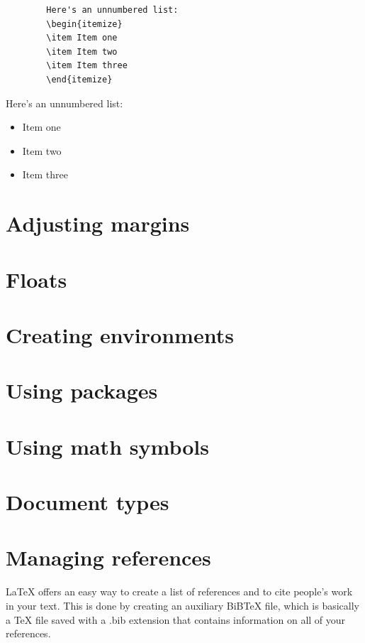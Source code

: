 \documentclass[12pts]{article}
\begin{document}
	\begin{multicols}{2}
		\begin{Verbatim}
		Here's an unnumbered list:
		\begin{itemize}
		\item Item one
		\item Item two
		\item Item three
		\end{itemize}
		\end{Verbatim}
		
		\columnbreak	
		
		Here's an unnumbered list:
		\begin{itemize}
			\item Item one
			\item Item two
			\item Item three
		\end{itemize}
	\end{multicols}
	
	\section{Adjusting margins}
	\section{Floats}
	\section{Creating environments}
	\section{Using packages}
	\section{Using math symbols}
	\section{Document types}
	\section{Managing references}
	
	{\LaTeX} offers an easy way to create a list of references and to cite people's work in your text. This is done by creating an auxiliary BiBTeX file, which is basically a {\TeX} file saved with a .bib extension that contains information on all of your references. 
	
\end{document}
